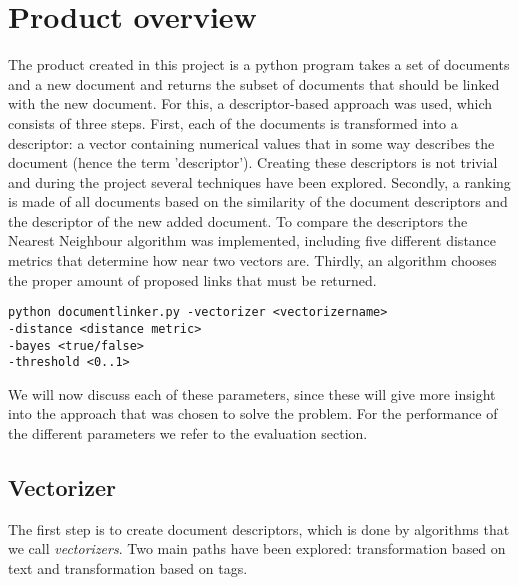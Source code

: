 \section{Product overview}

The product created in this project is a python program takes a set of documents and a new document and returns the subset of documents that should be linked with the new document. For this, a descriptor-based approach was used, which consists of three steps. First, each of the documents is transformed into a descriptor: a vector containing numerical values that in some way describes the document (hence the term 'descriptor'). Creating these descriptors is not trivial and during the project several techniques have been explored. Secondly, a ranking is made of all documents based on the similarity of the document descriptors and the descriptor of the new added document. To compare the descriptors the Nearest Neighbour algorithm was implemented, including five different distance metrics that determine how near two vectors are. Thirdly, an algorithm chooses the proper amount of proposed links that must be returned.

\begin{lstlisting}
python documentlinker.py -vectorizer <vectorizername> 
-distance <distance metric> 
-bayes <true/false>
-threshold <0..1>
\end{lstlisting}

We will now discuss each of these parameters, since these will give more insight into the approach that was chosen to solve the problem. For the performance of the different parameters we refer to the evaluation section. 

\subsection{Vectorizer}
The first step is to create document descriptors, which is done by algorithms that we call \emph{vectorizers}. Two main paths have been explored: transformation based on text and transformation based on tags.

